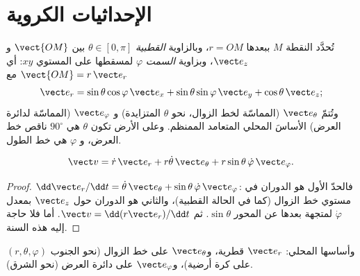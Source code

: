 \section{الإحداثيات الكروية}

\begin{definition}\label{def:b1:point-kinematics:spherical}
تُحدَّد النقطة $M$ ببعدها $r = OM$، وبالزاوية \emph{القطبية}
$\theta \in [0, \pi]$ بين $\vect{OM}$ و $\vect e_z$، وبزاوية \emph{السمت}
$\varphi$ لمسقطها على المستوي $xy$:
أي $\vect{OM} = r\,\vect e_r$ مع
\[
\vect e_r = \sin\theta\cos\varphi\,\vect e_x + \sin\theta\sin\varphi\,\vect e_y + \cos\theta\,\vect e_z ;
\]
وتُتمّ $\vect e_\theta$ (المماسّة لخط الزوال، نحو $\theta$ المتزايدة)
و $\vect e_\varphi$ (المماسّة لدائرة العرض) الأساسَ المحلي
المتعامد الممنظم. وعلى الأرض تكون $\theta$ هي $90^\circ$ ناقص
خط العرض، و $\varphi$ هي خط الطول.
\end{definition}

\begin{proposition}\label{prop:b1:point-kinematics:sphericalv}
\[
\vect v = \dot r\,\vect e_r + r\dot\theta\,\vect e_\theta + r\sin\theta\,\dot\varphi\,\vect e_\varphi .
\]
\end{proposition}

\begin{proof}
$\dd\vect e_r/\dd t = \dot\theta\,\vect e_\theta + \sin\theta\,\dot\varphi\,
\vect e_\varphi$: فالحدّ الأول هو الدوران في مستوي خط الزوال
(كما في الحالة القطبية)، والثاني هو الدوران حول $\vect e_z$ بمعدل
$\dot\varphi$ لمتجهة بعدها عن المحور
$\sin\theta$. ثم $\vect v = \dd(r\vect e_r)/\dd t$. أما  فلا
حاجة إليه هذه السنة.
\end{proof}

\begin{omfigure}

{\small {} $(r, \theta, \varphi)$ وأساسها
المحلي: $\vect e_r$ قطرية، و$\vect e_\theta$ على خط الزوال (نحو
الجنوب على كرة أرضية)، و$\vect e_\varphi$ على دائرة العرض (نحو
الشرق).}
\end{omfigure}

